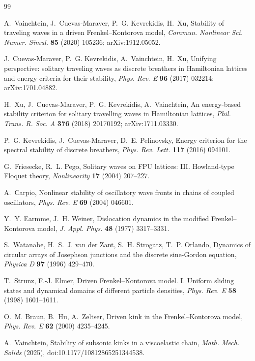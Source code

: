 \documentclass[11pt]{article}
\theoremstyle{plain}
\theoremstyle{definition}
\theoremstyle{remark}
\begin{document}
\begin{thebibliography}{99}\small

A.~Vainchtein, J.~Cuevas-Maraver, P.~G. Kevrekidis, H.~Xu,
Stability of traveling waves in a driven Frenkel--Kontorova model,
\emph{Commun. Nonlinear Sci. Numer. Simul.} \textbf{85} (2020) 105236;
arXiv:1912.05052.

J.~Cuevas-Maraver, P.~G. Kevrekidis, A.~Vainchtein, H.~Xu,
Unifying perspective: solitary traveling waves as discrete breathers in Hamiltonian
lattices and energy criteria for their stability,
\emph{Phys. Rev. E} \textbf{96} (2017) 032214; arXiv:1701.04882.

H.~Xu, J.~Cuevas-Maraver, P.~G. Kevrekidis, A.~Vainchtein,
An energy-based stability criterion for solitary travelling waves in Hamiltonian
lattices,
\emph{Phil. Trans. R. Soc. A} \textbf{376} (2018) 20170192; arXiv:1711.03330.

P.~G. Kevrekidis, J.~Cuevas-Maraver, D.~E. Pelinovsky,
Energy criterion for the spectral stability of discrete breathers,
\emph{Phys. Rev. Lett.} \textbf{117} (2016) 094101.

G.~Friesecke, R.~L. Pego,
Solitary waves on FPU lattices: III. Howland-type Floquet theory,
\emph{Nonlinearity} \textbf{17} (2004) 207--227.

A.~Carpio,
Nonlinear stability of oscillatory wave fronts in chains of coupled oscillators,
\emph{Phys. Rev. E} \textbf{69} (2004) 046601.

Y.~Y. Earmme, J.~H. Weiner,
Dislocation dynamics in the modified Frenkel--Kontorova model,
\emph{J. Appl. Phys.} \textbf{48} (1977) 3317--3331.

S.~Watanabe, H.~S.~J. van der Zant, S.~H. Strogatz, T.~P. Orlando,
Dynamics of circular arrays of Josephson junctions and the discrete sine-Gordon equation,
\emph{Physica D} \textbf{97} (1996) 429--470.

T.~Strunz, F.-J. Elmer,
Driven Frenkel--Kontorova model. I. Uniform sliding states and dynamical domains of
different particle densities,
\emph{Phys. Rev. E} \textbf{58} (1998) 1601--1611.

O.~M. Braun, B.~Hu, A.~Zeltser,
Driven kink in the Frenkel--Kontorova model,
\emph{Phys. Rev. E} \textbf{62} (2000) 4235--4245.

A.~Vainchtein,
Stability of subsonic kinks in a viscoelastic chain,
\emph{Math. Mech. Solids} (2025), doi:10.1177/10812865251344538.


\end{thebibliography}
\end{document}

